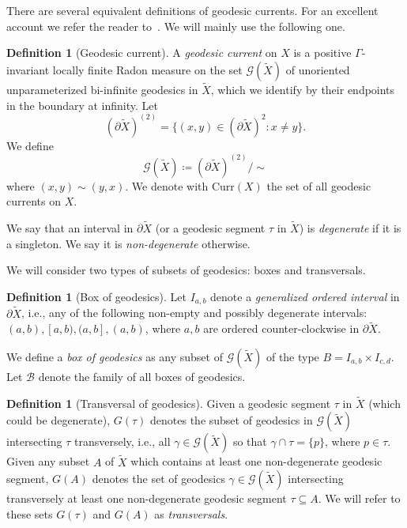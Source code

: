 \documentclass[12pt,article]{amsart}
\numberwithin{equation}{section}
\numberwithin{figure}{section}
\theoremstyle{definition}
\newtheorem{definition}[equation]{Definition}
\theoremstyle{plain}
\newcommand{\del}{\partial}
\newcommand*{\wt}[1]{\widetilde{#1}}
\begin{document}
  There are several equivalent definitions of geodesic currents. For an excellent account we refer the reader to~\cite[Chapter~3]{ES22:GeodesicCount}. We will mainly use the following one.
 \begin{definition}[Geodesic current]
 A \emph{geodesic current} on $X$ is a positive $\Gamma$-invariant locally finite Radon measure on the set $\mathcal{G}(\wt{X})$ of unoriented unparameterized bi-infinite geodesics in $\wt{X}$, which we identify by their endpoints in the boundary at infinity. Let
 \[(\del \wt{X})^{(2)}=\{ (x,y) \in (\del \wt{X})^{2} \colon x \neq y \}.\]
 We define
 \[
 \mathcal{G}(\wt{X}) \coloneqq (\del \wt{X})^{(2)}/\sim
 \]
 where $(x,y) \sim (y,x)$. We denote with $\mathrm{Curr}(X)$ the set of all geodesic currents on $X$.
 \end{definition}

We say that an interval in $\partial \wt{X}$ (or a geodesic segment $\tau$ in $\wt{X}$) is \emph{degenerate} if it is a singleton. We say it is \emph{non-degenerate} otherwise.

 We will consider two types of subsets of geodesics: boxes and transversals.

\begin{definition}[Box of geodesics]
Let $I_{a,b}$ denote a \emph{generalized ordered interval} in $\partial \wt{X}$, i.e., any of the following non-empty and possibly degenerate intervals: $(a,b),[a,b),(a,b], (a,b)$, where $a,b$ are ordered counter-clockwise in $\partial \wt{X}$. 

We define a \emph{box of geodesics} as any subset of $\mathcal{G}(\wt{X})$ of the type $B=I_{a,b} \times I_{c,d}$.
Let $\mathcal{B}$ denote the family of all boxes of geodesics.
\label{def:boxes}
\end{definition}

 \begin{definition}[Transversal of geodesics]
 Given a geodesic segment $\tau$ in $\wt{X}$ (which could be degenerate), $G(\tau)$ denotes the subset of geodesics in $\mathcal{G}(\wt{X})$ intersecting $\tau$ transversely, i.e., all $\gamma \in \mathcal{G}(\wt{X})$ so that $\gamma \cap \tau = \{ p \}$, where $p \in \tau$. Given any subset $A$ of $\wt{X}$ which contains at least one non-degenerate geodesic segment, $G(A)$ denotes the set of geodesics $\gamma \in \mathcal{G}(\wt{X})$ intersecting transversely at least one non-degenerate geodesic segment $\tau \subseteq A$. We will refer to these sets $G(\tau)$ and $G(A)$ as \emph{transversals}.
 \end{definition}
\end{document}
